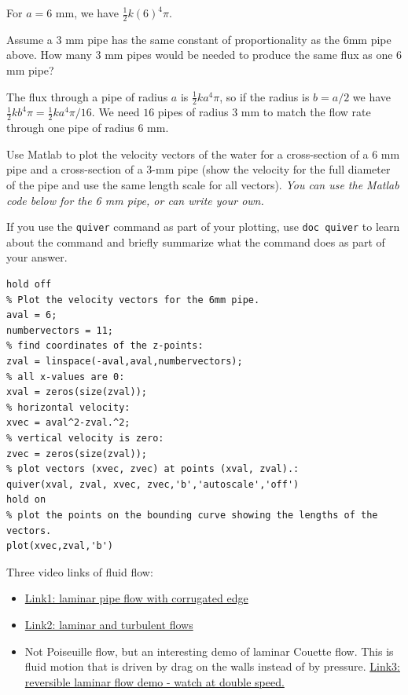 \documentclass[12pt,letterpaper,noanswers]{exam}
\begin{document}
\begin{questions}
\begin{parts}
\begin{solution}
For $a = 6$ mm, we have $\frac{1}{2}k(6)^4 \pi$.
\end{solution}

\item Assume a $3$ mm pipe has the same constant of proportionality as the $6$mm pipe above.  How many $3$ mm pipes would be needed to produce the same flux as one $6$ mm pipe?
\begin{solution}
The flux through a pipe of radius $a$ is $\frac{1}{2}ka^4\pi$, so if the radius is $b = a/2$ we have $\frac{1}{2}k b^4\pi = \frac{1}{2}ka^4\pi/16$.  We need $16$ pipes of radius $3$ mm to match the flow rate through one pipe of radius $6$ mm. 
\end{solution}
\item Use Matlab to plot the velocity vectors of the water for a cross-section of a $6$ mm pipe and a cross-section of a $3$-mm pipe (show the velocity for the full diameter of the pipe and use the same length scale for all vectors).  \emph{You can use the Matlab code below for the 6 mm pipe, or can write your own.}

If you use the \texttt{quiver} command as part of your plotting, use \texttt{doc quiver} to learn about the command and briefly summarize what the command does as part of your answer.

\begin{lstlisting}
hold off
% Plot the velocity vectors for the 6mm pipe.
aval = 6;
numbervectors = 11;
% find coordinates of the z-points:
zval = linspace(-aval,aval,numbervectors); 
% all x-values are 0:
xval = zeros(size(zval));
% horizontal velocity:
xvec = aval^2-zval.^2; 
% vertical velocity is zero:
zvec = zeros(size(zval)); 
% plot vectors (xvec, zvec) at points (xval, zval).:
quiver(xval, zval, xvec, zvec,'b','autoscale','off') 
hold on
% plot the points on the bounding curve showing the lengths of the vectors.
plot(xvec,zval,'b')
\end{lstlisting}

\end{parts}

Three video links of fluid flow:
\begin{itemize}
    \item {\color{blue}\href{https://www.youtube.com/watch?v=rknHorDj3Vk}{Link1: laminar pipe flow with corrugated edge}}
    \item {\color{blue}\href{https://www.youtube.com/embed/JO5U3aZlMzM?start=75&end=120&autoplay=1}{Link2: laminar and turbulent flows}}
    \item Not Poiseuille flow, but an interesting demo of laminar Couette flow.  This is fluid motion that is driven by drag on the walls instead of by pressure. \href{https://www.youtube.com/watch?v=nvmtPsBlCAs}{\color{blue} Link3: reversible laminar flow demo - watch at double speed.}
\end{itemize}


\end{questions}
\end{document}
